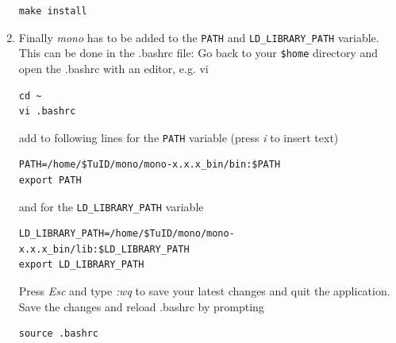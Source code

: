 \documentclass[11pt,twoside,a4paper]{fdyartcl}
\begin{document}
\begin{enumerate}
\begin{verbatim}
make install
\end{verbatim} 
\item Finally \emph{mono} has to be added to the \verb|PATH| and \verb|LD_LIBRARY_PATH| variable. This can be done in the .bashrc file: Go back to your \verb|$home| directory and open the .bashrc with an editor, e.g. vi
\begin{verbatim}
cd ~
vi .bashrc
\end{verbatim}
add to following lines for the \verb|PATH| variable (press \emph{i} to insert text)
\begin{verbatim}
PATH=/home/$TuID/mono/mono-x.x.x_bin/bin:$PATH
export PATH
\end{verbatim}
and for the \verb|LD_LIBRARY_PATH| variable
\begin{verbatim}
LD_LIBRARY_PATH=/home/$TuID/mono/mono-x.x.x_bin/lib:$LD_LIBRARY_PATH
export LD_LIBRARY_PATH
\end{verbatim}
Press \emph{Esc} and type \emph{:wq} to save your latest changes and quit the application. Save the changes and reload .bashrc by prompting
\begin{verbatim}
source .bashrc
\end{verbatim}
\end{enumerate} 
\end{document}
